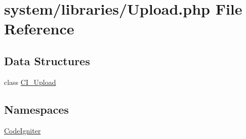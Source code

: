 \hypertarget{_upload_8php}{}\section{system/libraries/\+Upload.php File Reference}
\label{_upload_8php}
\subsection*{Data Structures}
\begin{DoxyCompactItemize}
\item 
class \mbox{\hyperlink{class_c_i___upload}{C\+I\+\_\+\+Upload}}
\end{DoxyCompactItemize}
\subsection*{Namespaces}
\begin{DoxyCompactItemize}
\item 
 \mbox{\hyperlink{namespace_code_igniter}{Code\+Igniter}}
\end{DoxyCompactItemize}
